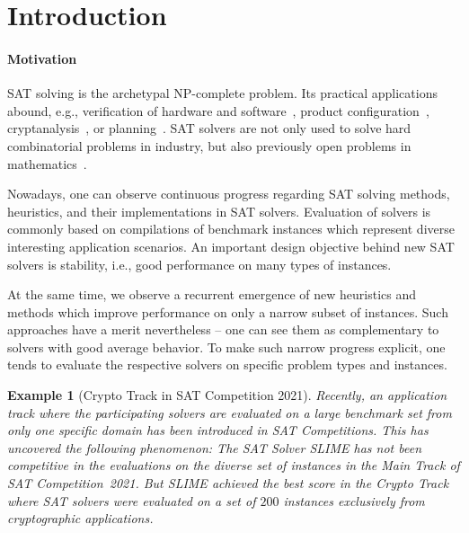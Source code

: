 \documentclass[conference]{IEEEtran}
\newtheorem{example}{Example}
\begin{document}
\section{Introduction}
\label{sec:introduction}

\paragraph{Motivation} %

SAT solving is the archetypal NP-complete problem.
Its practical applications abound, e.g., verification of hardware and software~\cite{Kaufmann:2021:Amulet,Buning:2020:QPRVerify}, product configuration~\cite{Janota:2014:Configuration}, cryptanalysis~\cite{Nejati:2020:CDCLCrypto}, or planning~\cite{Schreiber:2021:Lilotane}.
SAT solvers are not only used to solve hard combinatorial problems in industry, but also previously open problems in mathematics~\cite{Heule:2016:Pyth,Heule:2018:Schur}. 

Nowadays, one can observe continuous progress regarding SAT solving methods, heuristics, and their implementations in SAT solvers. 
Evaluation of solvers is commonly based on compilations of benchmark instances which represent diverse interesting application scenarios. 
An important design objective behind new SAT solvers is stability, i.e., good performance on many types of instances. 

At the same time, we observe a recurrent emergence of new heuristics and methods which improve performance on only a narrow subset of instances. 
Such approaches have a merit nevertheless -- one can see them as complementary to solvers with good average behavior. 
To make such narrow progress explicit, one tends to evaluate the respective solvers on specific problem types and instances.

\begin{example}[Crypto Track in SAT Competition 2021]
Recently, an application track where the participating solvers are evaluated on a large benchmark set from only one specific domain has been introduced in SAT Competitions.
This has uncovered the following phenomenon:
The SAT Solver \emph{SLIME} has not been competitive in the evaluations on the diverse set of instances in the Main Track of SAT Competition~2021. 
But \emph{SLIME} achieved the best score in the Crypto Track where SAT solvers were evaluated on a set of $200$ instances exclusively from cryptographic applications. 
\end{example}
\end{document}
